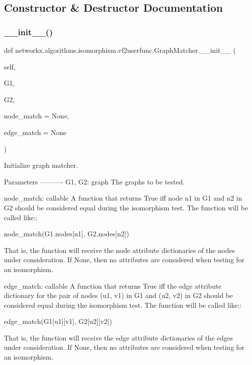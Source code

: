 \subsection{Constructor \& Destructor Documentation}
\mbox{\label{classnetworkx_1_1algorithms_1_1isomorphism_1_1vf2userfunc_1_1GraphMatcher_a961d057ce8c3c616c787b384c7c1ae77}} 
\subsubsection{\texorpdfstring{\+\_\+\+\_\+init\+\_\+\+\_\+()}{\_\_init\_\_()}}
{\footnotesize\ttfamily def networkx.\+algorithms.\+isomorphism.\+vf2userfunc.\+Graph\+Matcher.\+\_\+\+\_\+init\+\_\+\+\_\+ (\begin{DoxyParamCaption}\item[{}]{self,  }\item[{}]{G1,  }\item[{}]{G2,  }\item[{}]{node\+\_\+match = {\ttfamily None},  }\item[{}]{edge\+\_\+match = {\ttfamily None} }\end{DoxyParamCaption})}

\begin{DoxyVerb}Initialize graph matcher.

Parameters
----------
G1, G2: graph
    The graphs to be tested.

node_match: callable
    A function that returns True iff node n1 in G1 and n2 in G2
    should be considered equal during the isomorphism test. The
    function will be called like::

       node_match(G1.nodes[n1], G2.nodes[n2])

    That is, the function will receive the node attribute dictionaries
    of the nodes under consideration. If None, then no attributes are
    considered when testing for an isomorphism.

edge_match: callable
    A function that returns True iff the edge attribute dictionary for
    the pair of nodes (u1, v1) in G1 and (u2, v2) in G2 should be
    considered equal during the isomorphism test. The function will be
    called like::

       edge_match(G1[u1][v1], G2[u2][v2])

    That is, the function will receive the edge attribute dictionaries
    of the edges under consideration. If None, then no attributes are
    considered when testing for an isomorphism.\end{DoxyVerb}
 

